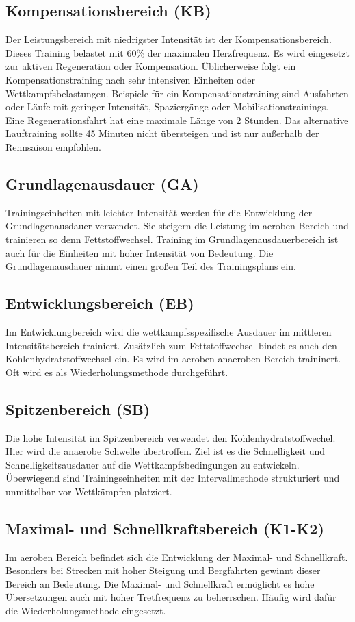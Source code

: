 \subsection{Kompensationsbereich (KB)}
Der Leistungsbereich mit niedrigster Intensität ist der Kompensationsbereich. Dieses Training belastet mit 60\% der maximalen Herzfrequenz. Es wird eingesetzt zur aktiven Regeneration oder Kompensation. Üblicherweise folgt ein Kompensationstraining nach sehr intensiven Einheiten oder Wettkampfsbelastungen. Beispiele für ein Kompensationstraining sind Ausfahrten oder Läufe mit geringer Intensität, Spaziergänge oder Mobilisationstrainings. \cite[31-32]{Radsporttraining}
Eine Regenerationsfahrt hat eine maximale Länge von 2 Stunden. Das alternative Lauftraining sollte 45 Minuten nicht übersteigen und ist nur außerhalb der Rennsaison empfohlen.
\subsection{Grundlagenausdauer (GA)}
Trainingseinheiten mit leichter Intensität werden für die Entwicklung der Grundlagenausdauer verwendet. Sie steigern die Leistung im aeroben Bereich  und trainieren so denn Fettstoffwechsel.
Training im Grundlagenausdauerbereich ist auch für die Einheiten mit hoher Intensität von Bedeutung. Die Grundlagenausdauer nimmt einen großen Teil des Trainingsplans ein.
\subsection{Entwicklungsbereich (EB)}
Im Entwicklungbereich wird die wettkampfsspezifische Ausdauer im mittleren Intensitätsbereich trainiert. Zusätzlich zum Fettstoffwechsel bindet es auch den Kohlenhydratstoffwechsel ein. Es wird im aeroben-anaeroben Bereich traininert. Oft wird es als Wiederholungsmethode durchgeführt.
\subsection{Spitzenbereich (SB)}
Die hohe Intensität im Spitzenbereich verwendet den Kohlenhydratstoffwechel. Hier wird die anaerobe Schwelle übertroffen. Ziel ist es die Schnelligkeit und Schnelligkeitsausdauer auf die Wettkampfsbedingungen zu entwickeln. Überwiegend sind Trainingseinheiten mit der Intervallmethode strukturiert und unmittelbar vor Wettkämpfen platziert.
\subsection{Maximal- und Schnellkraftsbereich (K1-K2)}
Im aeroben Bereich befindet sich die Entwicklung der Maximal- und Schnellkraft. Besonders bei Strecken mit hoher Steigung und Bergfahrten gewinnt dieser Bereich an Bedeutung. Die Maximal- und Schnellkraft ermöglicht es hohe Übersetzungen auch mit hoher Tretfrequenz zu beherrschen. Häufig wird dafür die Wiederholungsmethode eingesetzt.
